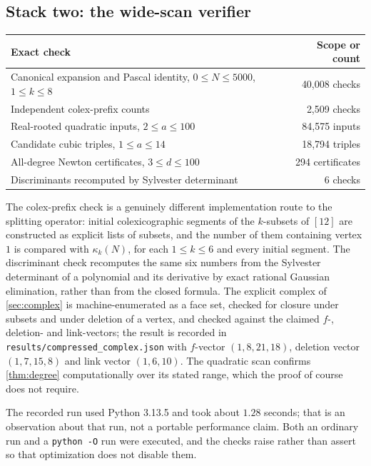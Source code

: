 \documentclass[11pt,letterpaper]{article}
\numberwithin{equation}{section}
\theoremstyle{definition}
\theoremstyle{remark}
\newcommand{\kap}{\kappa}
\begin{document}
\subsection{Stack two: the wide-scan verifier}

\begin{center}
\begin{tabular}{@{}p{}r@{}}
\toprule
Exact check & Scope or count\\
\midrule
Canonical expansion and Pascal identity, $0\le N\le5000$, $1\le k\le8$
 & 40,008 checks\\
Independent colex-prefix counts & 2,509 checks\\
Real-rooted quadratic inputs, $2\le a\le100$ & 84,575 inputs\\
Candidate cubic triples, $1\le a\le14$ & 18,794 triples\\
All-degree Newton certificates, $3\le d\le100$ & 294 certificates\\
Discriminants recomputed by Sylvester determinant & 6 checks\\
\bottomrule
\end{tabular}
\end{center}

The colex-prefix check is a genuinely different implementation route to the
splitting operator: initial colexicographic segments of the $k$-subsets of
$[12]$ are constructed as explicit lists of subsets, and the number of them
containing vertex $1$ is compared with $\kap_k(N)$, for each $1\le k\le6$ and
every initial segment. The discriminant check recomputes the same six numbers
from the Sylvester determinant of a polynomial and its derivative by exact
rational Gaussian elimination, rather than from the closed formula. The
explicit complex of \cref{sec:complex} is machine-enumerated as a face set,
checked for closure under subsets and under deletion of a vertex, and checked
against the claimed $f$-, deletion- and link-vectors; the result is recorded
in \texttt{results/compressed\_complex.json} with $f$-vector $(1,8,21,18)$,
deletion vector $(1,7,15,8)$ and link vector $(1,6,10)$. The quadratic scan
confirms \cref{thm:degree} computationally over its stated range, which the
proof of course does not require.

The recorded run used Python 3.13.5 and took about $1.28$ seconds; that is an
observation about that run, not a portable performance claim. Both an ordinary
run and a \texttt{python -O} run were executed, and the checks raise rather
than assert so that optimization does not disable them.
\end{document}

